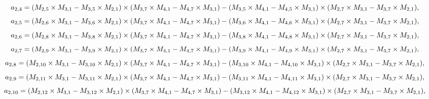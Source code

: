 \documentclass[10pt]{asme2ej}
\begin{document}
\begin{landscape}
\begin{equation}
    a_{2,4} = (M_{2,5}\times M_{3,1}-M_{3,5}\times M_{2,1})\times (M_{3,7}\times M_{4,1}-M_{4,7}\times M_{3,1})\\-(M_{3,5}\times M_{4,1}-M_{4,5}\times M_{3,1})\times (M_{2,7}\times M_{3,1}-M_{3,7}\times M_{2,1}),
\end{equation}
\begin{equation}
    a_{2,5} = (M_{2,6}\times M_{3,1}-M_{3,6}\times M_{2,1})\times (M_{3,7}\times M_{4,1}-M_{4,7}\times M_{3,1})\\-(M_{3,6}\times M_{4,1}-M_{4,6}\times M_{3,1})\times (M_{2,7}\times M_{3,1}-M_{3,7}\times M_{2,1}),
\end{equation}
\begin{equation}
    a_{2,6} = (M_{2,8}\times M_{3,1}-M_{3,8}\times M_{2,1})\times (M_{3,7}\times M_{4,1}-M_{4,7}\times M_{3,1})\\-(M_{3,8}\times M_{4,1}-M_{4,8}\times M_{3,1})\times (M_{2,7}\times M_{3,1}-M_{3,7}\times M_{2,1}),
\end{equation}
\begin{equation}
    a_{2,7} = (M_{2,9}\times M_{3,1}-M_{3,9}\times M_{2,1})\times (M_{3,7}\times M_{4,1}-M_{4,7}\times M_{3,1})\\-(M_{3,9}\times M_{4,1}-M_{4,9}\times M_{3,1})\times (M_{2,7}\times M_{3,1}-M_{3,7}\times M_{2,1}),
\end{equation}
\begin{equation}
    a_{2,8} = (M_{2,10}\times M_{3,1}-M_{3,10}\times M_{2,1})\times (M_{3,7}\times M_{4,1}-M_{4,7}\times M_{3,1})\\-(M_{3,10}\times M_{4,1}-M_{4,10}\times M_{3,1})\times (M_{2,7}\times M_{3,1}-M_{3,7}\times M_{2,1}),
\end{equation}
\begin{equation}
    a_{2,9} = (M_{2,11}\times M_{3,1}-M_{3,11}\times M_{2,1})\times (M_{3,7}\times M_{4,1}-M_{4,7}\times M_{3,1})\\-(M_{3,11}\times M_{4,1}-M_{4,11}\times M_{3,1})\times (M_{2,7}\times M_{3,1}-M_{3,7}\times M_{2,1}),
\end{equation}
\begin{equation}
    a_{2,10} = (M_{2,12}\times M_{3,1}-M_{3,12}\times M_{2,1})\times (M_{3,7}\times M_{4,1}-M_{4,7}\times M_{3,1})\\-(M_{3,12}\times M_{4,1}-M_{4,12}\times M_{3,1})\times (M_{2,7}\times M_{3,1}-M_{3,7}\times M_{2,1}),
\end{equation}
\begin{equation}

\end{equation}
\end{landscape}
\end{document}
